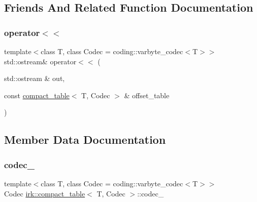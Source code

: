 \subsection{Friends And Related Function Documentation}
\mbox{\label{classirk_1_1compact__table_aabbde77b5cb5faeef5fe72eff9624aa5}} 
\subsubsection{\texorpdfstring{operator$<$$<$}{operator<<}}
{\footnotesize\ttfamily template$<$class T, class Codec = coding\+::varbyte\+\_\+codec$<$\+T$>$$>$ \\
std\+::ostream\& operator$<$$<$ (\begin{DoxyParamCaption}\item[{std\+::ostream \&}]{out,  }\item[{const \mbox{\hyperlink{classirk_1_1compact__table}{compact\+\_\+table}}$<$ T, Codec $>$ \&}]{offset\+\_\+table }\end{DoxyParamCaption})\hspace{0.3cm}{\ttfamily [friend]}}



\subsection{Member Data Documentation}
\mbox{\label{classirk_1_1compact__table_a780f480df7180c7b750907dc1954e741}} 
\subsubsection{\texorpdfstring{codec\+\_\+}{codec\_}}
{\footnotesize\ttfamily template$<$class T, class Codec = coding\+::varbyte\+\_\+codec$<$\+T$>$$>$ \\
Codec \mbox{\hyperlink{classirk_1_1compact__table}{irk\+::compact\+\_\+table}}$<$ T, Codec $>$\+::codec\+\_\+\hspace{0.3cm}{\ttfamily [protected]}}

\mbox{\label{classirk_1_1compact__table_adf7928280ada85abfdf858586aeadb78}} 
